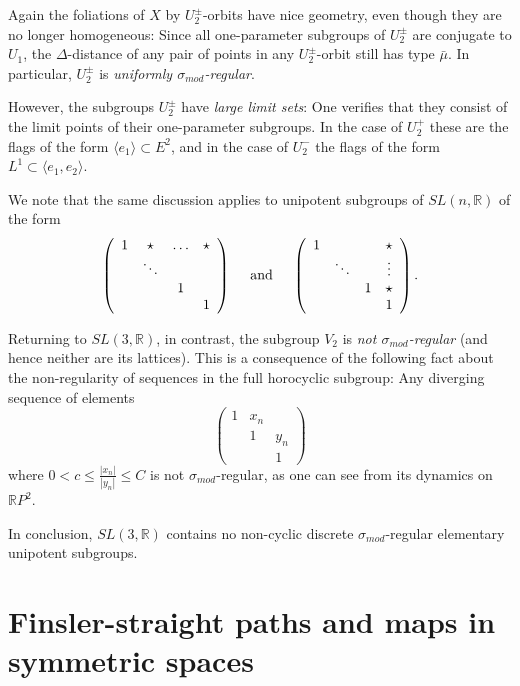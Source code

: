 \documentclass[12pt]{article}
\theoremstyle{boldplain}
\theoremstyle{bolddefinition}
\numberwithin{equation}{section}
\def\R{{\mathbb R}}
\def\De{\Delta}
\def\si{\sigma}
\def\simod{\si_{mod}}
\def\<{\langle}
\def\>{\rangle}
\begin{document}
Again the foliations of $X$ by $U_2^{\pm}$-orbits have nice geometry, 
even though they are no longer homogeneous:
Since all one-parameter subgroups of $U_2^{\pm}$ are conjugate to $U_1$,
the $\De$-distance of any pair of points in any $U_2^{\pm}$-orbit still has type $\bar\mu$.
In particular, $U_2^{\pm}$ is {\em uniformly $\simod$-regular}.

However, the subgroups $U_2^{\pm}$ have {\em large limit sets}:
One verifies that they consist of the limit points of their one-parameter subgroups.
In the case of $U_2^+$ these are the flags of the form $\<e_1\>\subset E^2$,
and in the case of $U_2^-$ the flags of the form $L^1\subset \<e_1,e_2\>$.

We note that the same discussion applies to unipotent subgroups of $SL(n,\R)$ of the form
$$ 
\left( \begin{array}{cccc}
1&\star& \ldots &\star\\
&\ddots&  &\\
&          & 1& \\
&          &    &    1\end{array}
\right)
\quad \hbox{ and }  \quad 
\left( \begin{array}{cccc}
1&         & &\star\\
&\ddots&  &\vdots\\
&          & 1& \star\\
&          &    &    1\end{array}
\right).
$$

Returning to $SL(3,\R)$,
in contrast, the subgroup $V_2$ is {\em not $\simod$-regular} (and hence neither are its lattices).
This is a consequence of the following fact about the non-regularity of sequences in the full horocyclic subgroup:
Any diverging sequence of elements
$$
\left( \begin{array}{ccc}
1&x_n&\\
&1&y_n\\
&&1\end{array}
\right)
$$
where $0< c\leq\frac{|x_n|}{|y_n|}\leq C$ 
is not $\simod$-regular,
as one can see from its dynamics on $\R P^2$.

In conclusion,
$SL(3,\R)$ contains no non-cyclic discrete $\simod$-regular elementary unipotent subgroups.  



\section{Finsler-straight paths and maps in symmetric spaces} 
\label{sec:finsstraight}
\end{document}
